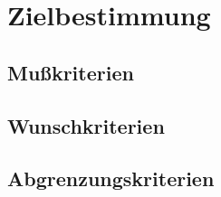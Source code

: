 \chapter{Zielbestimmung}

\section{Mußkriterien}



\setcounter{enumi}{0}

\section{Wunschkriterien}



\setcounter{enumi}{0}

\section{Abgrenzungskriterien}



\setcounter{enumi}{0}
